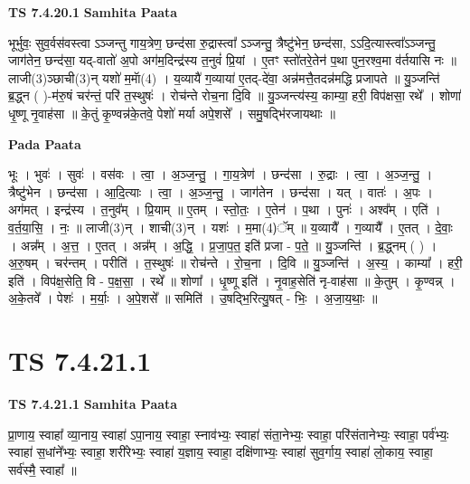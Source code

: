 \documentclass[17pt]{extarticle}
\begin{document}
\textbf{TS 7.4.20.1 } \newline
\textbf{Samhita Paata} \newline

भूर्भुवः॒ सुव॒र्वस॑वस्त्वा ऽञ्जन्तु गाय॒त्रेण॒ छन्द॑सा रु॒द्रास्त्वा᳚ ऽञ्जन्तु॒ त्रैष्टु॑भेन॒ छन्द॑सा, ऽऽदि॒त्यास्त्वा᳚ऽञ्जन्तु॒ जाग॑तेन॒ छन्द॑सा॒ यद्-वातो॑ अ॒पो अग॑म॒दिन्द्र॑स्य त॒नुवं॑ प्रि॒यां । ए॒तꣳ स्तो॑तरे॒तेन॑ प॒था पुन॒रश्व॒मा व॑र्तयासि नः ॥ लाजी(3)ञ्छाची(3)न् यशो॑ म॒माॅ(4) । य॒व्यायै॑ ग॒व्याया॑ ए॒तद्-दे॑वा॒ अन्न॑मत्तै॒तदन्न॑मद्धि प्रजापते ॥ यु॒ञ्जन्ति॑ ब्र॒द्ध्न ( )-म॑रु॒षं चर॑न्तं॒ परि॑ त॒स्थुषः॑ । रोच॑न्ते रोच॒ना दि॒वि ॥ यु॒ञ्जन्त्य॑स्य॒ काम्या॒ हरी॒ विप॑क्षसा॒ रथे᳚ । शोणा॑ धृ॒ष्णू नृ॒वाह॑सा ॥ के॒तुं कृ॒ण्वन्न॑के॒तवे॒ पेशो॑ मर्या अपे॒शसे᳚ । समु॒षद्भि॑रजायथाः ॥ \newline

\textbf{Pada Paata} \newline

भूः । भुवः॑ । सुवः॑ । वस॑वः । त्वा॒ । अ॒ञ्ज॒न्तु॒ । गा॒य॒त्रेण॑ । छन्द॑सा । रु॒द्राः । त्वा॒ । अ॒ञ्ज॒न्तु॒ । त्रैष्टु॑भेन । छन्द॑सा । आ॒दि॒त्याः । त्वा॒ । अ॒ञ्ज॒न्तु॒ । जाग॑तेन । छन्द॑सा । यत् । वातः॑ । अ॒पः । अग॑मत् । इन्द्र॑स्य । त॒नुव᳚म् । प्रि॒याम् ॥ ए॒तम् । स्तो॒तः॒ । ए॒तेन॑ । प॒था । पुनः॑ । अश्व᳚म् । एति॑ । व॒र्त॒या॒सि॒ । नः॒ ॥ लाजी(3)न् । शाची(3)न् । यशः॑ । म॒मा(4)ॅम् ॥ य॒व्यायै᳚ । ग॒व्यायै᳚ । ए॒तत् । दे॒वाः॒ । अन्न᳚म् । अ॒त्त॒ । ए॒तत् । अन्न᳚म् । अ॒द्धि॒ । प्र॒जा॒प॒त॒ इति॑ प्रजा - प॒ते॒ ॥ यु॒ञ्जन्ति॑ । ब्र॒द्ध्नम् ( ) । अ॒रु॒षम् । चर॑न्तम् । परीति॑ । त॒स्थुषः॑ ॥ रोच॑न्ते । रो॒च॒ना । दि॒वि ॥ यु॒ञ्जन्ति॑ । अ॒स्य॒ । काम्या᳚ । हरी॒ इति॑ । विप॑क्ष॒सेति॒ वि - प॒क्ष॒सा॒ । रथे᳚ ॥ शोणा᳚ । धृ॒ष्णू इति॑ । नृ॒वाह॒सेति॑ नृ-वाह॑सा ॥ के॒तुम् । कृ॒ण्वन्न् । अ॒के॒तवे᳚ । पेशः॑ । म॒र्याः॒ । अ॒पे॒शसे᳚ ॥ समिति॑ । उ॒षद्भि॒रित्यु॒षत् - भिः॒ । अ॒जा॒य॒थाः॒ ॥  \newline




\section*{ TS 7.4.21.1 }

\textbf{TS 7.4.21.1 } \newline
\textbf{Samhita Paata} \newline

प्रा॒णाय॒ स्वाहा᳚ व्या॒नाय॒ स्वाहा॑ ऽपा॒नाय॒ स्वाहा॒ स्नाव॑भ्यः॒ स्वाहा॑ संता॒नेभ्यः॒ स्वाहा॒ परि॑संतानेभ्यः॒ स्वाहा॒ पर्व॑भ्यः॒ स्वाहा॑ स॒धांने᳚भ्यः॒ स्वाहा॒ शरी॑रेभ्यः॒ स्वाहा॑ य॒ज्ञाय॒ स्वाहा॒ दक्षि॑णाभ्यः॒ स्वाहा॑ सुव॒र्गाय॒ स्वाहा॑ लो॒काय॒ स्वाहा॒ सर्व॑स्मै॒ स्वाहा᳚ ॥ \newline
\end{document}
